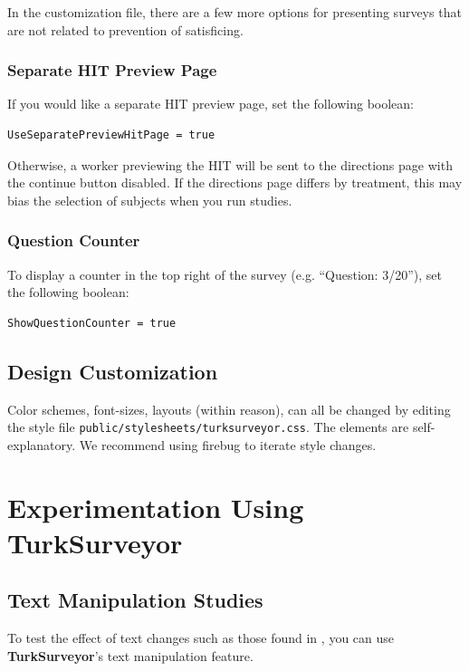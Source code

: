 \documentclass[12pt]{article}
\begin{document}
In the customization file, there are a few more options for presenting surveys that are not related to prevention of satisficing.

\subsubsection{Separate HIT Preview Page}

If you would like a separate HIT preview page, set the following boolean:

\begin{verbatim}
UseSeparatePreviewHitPage = true
\end{verbatim}

Otherwise, a worker previewing the HIT will be sent to the directions page with the continue button disabled. If the directions page differs by treatment, this may bias the selection of subjects when you run studies.

\subsubsection{Question Counter}

To display a counter in the top right of the survey (e.g. ``Question: 3/20''), set the following boolean:

\begin{verbatim}
ShowQuestionCounter = true
\end{verbatim}

\subsection{Design Customization}

Color schemes, font-sizes, layouts (within reason), can all be changed by editing the style file {\tt{public/stylesheets/turksurveyor.css}}. The elements are self-explanatory. We recommend using firebug to iterate style changes.

\section{Experimentation Using \textbf{TurkSurveyor}}

\subsection{Text Manipulation Studies}

To test the effect of text changes such as those found in \citet{Thaler1985, Opp09, KapelnerChandler2010}, you can use \textbf{TurkSurveyor}'s text manipulation feature.
\end{document}
